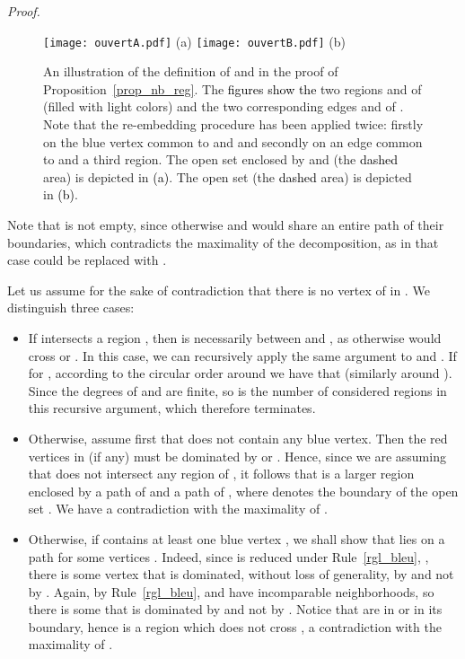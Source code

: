 \documentclass[a4paper,11pt]{article}
\newcommand{\rrgl}   [1] {Rule~\ref{#1}\xspace}
\newenvironment{proof}{\noindent \textit{Proof. }}{\hfill\vspace{.2cm}}
\newcommand{\add}   [1] {\textcolor{red} {#1}}
\newcommand{\addOK}   [1] {\textcolor{black} {#1}}
\newcommand{\modif} [2] {\add{#2}}
\newcommand{\modifOK} [2] {\addOK{#2}}
\begin{document}
\begin{proof}
\begin{figure}[h]
\begin{center}
\texttt{[image: ouvertA.pdf]} (a)
   \texttt{[image: ouvertB.pdf]} (b)
\end{center}
   \caption{An illustration of the definition of \modif{,}{} and  in the proof of Proposition~\ref{prop_nb_reg}. The \modifOK{}{figures show the} two regions  and  of  (filled with light colors) and the two corresponding edges  and  of  \modif{are depicted in (a)}{}. Note that the re-embedding procedure has been applied twice: firstly on the blue vertex common to  and  and secondly on an edge common to  and a third region. The open set  enclosed by  and  (the \modifOK{dark}{dashed} area) is depicted in \modifOK{(b)}{(a)}.\modif{The open set  (the dark area) is depicted in (c). Finally,}{} The open set  (the \modifOK{dark}{dashed} area) is depicted in \modifOK{(d)}{(b)}. }
   \label{fig_ouvert}
\end{figure}

 Note that  is not empty, since otherwise  and  would share an entire path of their boundaries, which contradicts the maximality of the decomposition, as in that case  could be replaced with .

 Let us assume for the sake of contradiction that there is no vertex of  in . We distinguish three cases:
\begin{itemize}\itemsep0em


\item If  intersects a region , then  is necessarily between  and , as otherwise  would cross  or . In this case, we can recursively apply the same argument to  and . If  for , according to the circular order around  we have that   (similarly around ). Since the degrees of  and  are finite, so is the number of considered regions  in this recursive argument, which therefore terminates.

\item Otherwise, assume first that  does not contain any blue vertex.  Then the red vertices in  (if any) must be dominated by  or . Hence, since we are assuming that   does not intersect any region  of , it follows that   is a larger region enclosed by a path of  and a path of , where  denotes the boundary of the open set . We have a contradiction with the maximality of .


\item Otherwise, if  contains at least one blue vertex , we shall show that  lies on a path  for some vertices . Indeed, since  is reduced under \rrgl{rgl_bleu}, , there is some vertex  that is dominated, without loss of generality, by  and not by . Again, by \rrgl{rgl_bleu},  and  have incomparable neighborhoods, so there is some  that is dominated by  and not by . Notice that  are in  or in its boundary, hence  is a region which does not cross , a contradiction with the maximality of .


\end{itemize}\vspace{-.7cm}
\end{proof}
\end{document}
